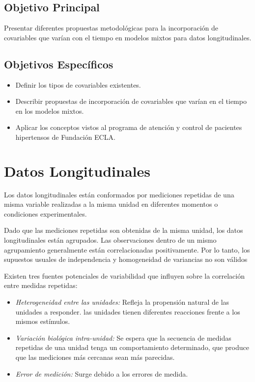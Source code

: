 \documentclass[spanish]{article}
\numberwithin{figure}{subsection}
\numberwithin{equation}{subsection}
\numberwithin{table}{subsection}
\begin{document}
\subsection{Objetivo Principal}

Presentar diferentes propuestas metodológicas para la incorporación de
covariables que varían con el tiempo en modelos mixtos para datos
longitudinales.

\subsection{Objetivos Específicos}

\begin{itemize}
	\item Definir los tipos de covariables existentes.
	\item Describir propuestas de incorporación de covariables que varían en el
	tiempo en los modelos mixtos.
	\item Aplicar los conceptos vistos al programa de
	atención y control de pacientes hipertensos de Fundación ECLA.
\end{itemize}

\newpage
\section{Datos Longitudinales}

Los datos longitudinales están conformados por mediciones repetidas de una misma
variable realizadas a la misma unidad en diferentes momentos o condiciones
experimentales.

Dado que las mediciones repetidas son obtenidas de la misma unidad, los datos
longitudinales están agrupados. Las observaciones dentro de un mismo
agrupamiento generalmente están correlacionadas positivamente. Por lo tanto, los
supuestos usuales de independencia y homogeneidad de variancias no son válidos

Existen tres fuentes potenciales de variabilidad que influyen sobre la
correlación entre medidas repetidas:

\begin{itemize}
	\item \textit{Heterogeneidad entre las unidades:} Refleja la propensión
	natural de las unidades a responder. las unidades tienen diferentes
	reacciones frente a los mismos estímulos.
	\item \textit{Variación biológica intra-unidad:} Se espera que la secuencia
	de medidas repetidas de una unidad tenga un comportamiento determinado, que
	produce que las mediciones más cercanas sean más parecidas.
	\item \textit{Error de medición:} Surge debido a los errores de medida.
\end{itemize}
\end{document}
